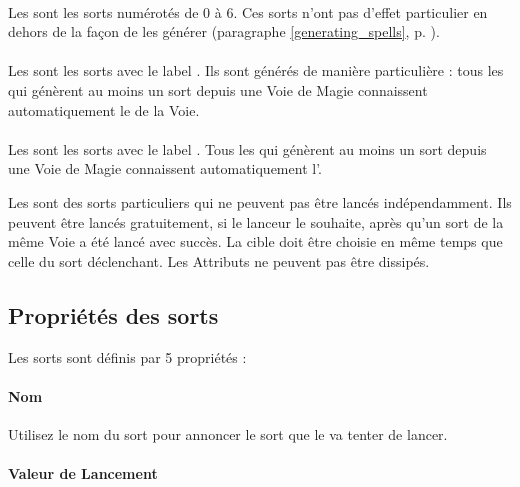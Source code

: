 \paragraph{\learnedspells}

Les \learnedspells{} sont les sorts numérotés de 0 à 6. Ces sorts n'ont pas d'effet particulier en dehors de la façon de les générer (paragraphe \ref{generating_spells}, p. \pageref{generating_spells}).

\paragraph{\traitspells}

Les \traitspells{} sont les sorts avec le label \og \traitspellnumber{} \fg{}. Ils sont générés de manière particulière : tous les \wizards{} qui génèrent au moins un sort depuis une Voie de Magie connaissent automatiquement le \traitspell{} de la Voie.

\paragraph{\attributespells}

Les \attributespells{} sont les sorts avec le label \og \attributespellnumber{} \fg{}. Tous les \wizards{} qui génèrent au moins un sort depuis une Voie de Magie connaissent automatiquement l'\attributespell{}.

Les \attributespells{} sont des sorts particuliers qui ne peuvent pas être lancés indépendamment. Ils peuvent être lancés gratuitement, si le lanceur le souhaite, après qu'un sort de la même Voie a été lancé avec succès. La cible doit être choisie en même temps que celle du sort déclenchant. Les Attributs ne peuvent pas être dissipés.


\subsection{Propriétés des sorts}

Les sorts sont définis par 5 propriétés :

\paragraph{Nom} 

Utilisez le nom du sort pour annoncer le sort que le \wizard{} va tenter de lancer.

\paragraph{Valeur de Lancement} 

